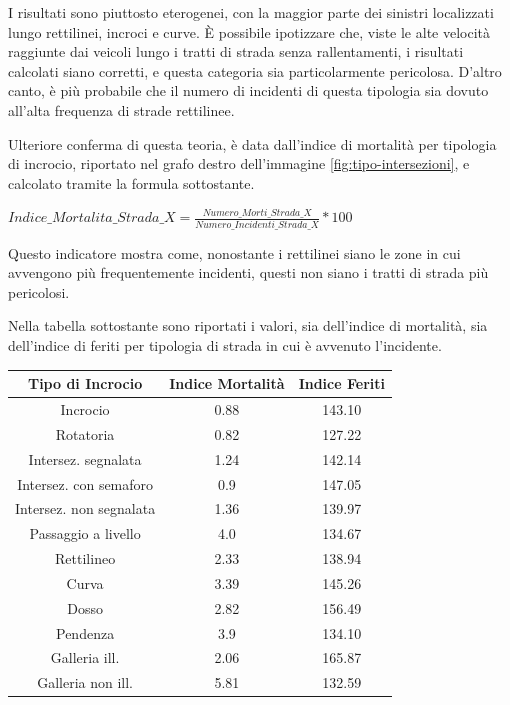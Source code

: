 \documentclass[a4paper,12pt]{report}
\begin{document}
I risultati sono piuttosto eterogenei, con la maggior parte dei sinistri 
localizzati lungo rettilinei, incroci e curve. 
\`E possibile ipotizzare che, viste le alte velocità raggiunte dai veicoli 
lungo i tratti di strada senza rallentamenti, i risultati calcolati siano corretti, 
e questa categoria sia particolarmente pericolosa. 
D'altro canto, è più probabile che il numero di incidenti di questa tipologia sia dovuto 
all'alta frequenza di strade rettilinee. 

Ulteriore conferma di questa teoria, è data dall'indice di mortalità per tipologia di incrocio, 
riportato nel grafo destro dell'immagine \ref{fig:tipo-intersezioni}, e calcolato tramite la 
formula sottostante. 

\begin{center}
    $Indice\_Mortalita\_Strada\_X = \displaystyle \frac{Numero\_Morti\_Strada\_X}{Numero\_Incidenti\_Strada\_X} * 100$ 
\end{center}

Questo indicatore mostra come, nonostante i rettilinei siano le zone in cui 
avvengono più frequentemente incidenti, questi non siano i tratti di 
strada più pericolosi. 

Nella tabella sottostante sono riportati i valori, sia dell'indice di mortalità, 
sia dell'indice di feriti per tipologia di strada in cui è avvenuto l'incidente. 

\begin{center}
    \def\arraystretch{1.5}%
    \begin{tabular}{ |c|c|c| } 
    \hline
    Tipo di Incrocio & Indice Mortalità & Indice Feriti \\ 
    \hline
    \rowcolor{TableGray}
    Incrocio                & 0.88 & 143.10 \\
    Rotatoria               & 0.82 & 127.22 \\
    \rowcolor{TableGray}
    Intersez. segnalata     & 1.24 & 142.14 \\
    Intersez. con semaforo  & 0.9 & 147.05 \\
    \rowcolor{TableGray}
    Intersez. non segnalata & 1.36 & 139.97\\
    Passaggio a livello     & 4.0 & 134.67\\
    \rowcolor{TableGray}
    Rettilineo              & 2.33 & 138.94\\
    Curva                   & 3.39 & 145.26\\
    \rowcolor{TableGray}
    Dosso                   & 2.82 & 156.49\\
    Pendenza                & 3.9 & 134.10\\
    \rowcolor{TableGray}
    Galleria ill.           & 2.06 & 165.87\\
    Galleria non ill.       & 5.81 & 132.59\\
    \hline
    \end{tabular}
\end{center}
\end{document}
